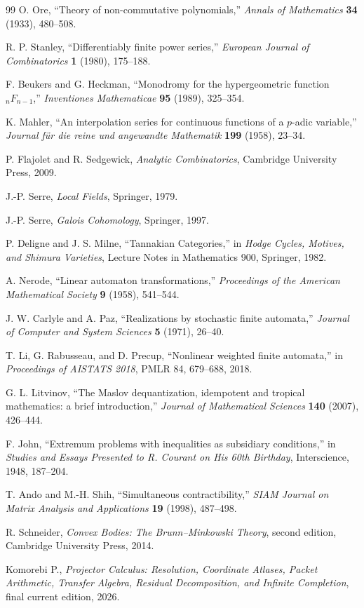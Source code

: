 \documentclass[11pt]{article}
\theoremstyle{definition}
\theoremstyle{remark}
\begin{document}
\begin{thebibliography}{99}
O. Ore, ``Theory of non-commutative polynomials,'' \emph{Annals of Mathematics} \textbf{34} (1933), 480--508.

R. P. Stanley, ``Differentiably finite power series,'' \emph{European Journal of Combinatorics} \textbf{1} (1980), 175--188.

F. Beukers and G. Heckman, ``Monodromy for the hypergeometric function \({}_nF_{n-1}\),'' \emph{Inventiones Mathematicae} \textbf{95} (1989), 325--354.

K. Mahler, ``An interpolation series for continuous functions of a \(p\)-adic variable,'' \emph{Journal f\"ur die reine und angewandte Mathematik} \textbf{199} (1958), 23--34.

P. Flajolet and R. Sedgewick, \emph{Analytic Combinatorics}, Cambridge University Press, 2009.

J.-P. Serre, \emph{Local Fields}, Springer, 1979.

J.-P. Serre, \emph{Galois Cohomology}, Springer, 1997.

P. Deligne and J. S. Milne, ``Tannakian Categories,'' in \emph{Hodge Cycles, Motives, and Shimura Varieties}, Lecture Notes in Mathematics 900, Springer, 1982.


A. Nerode, ``Linear automaton transformations,'' \emph{Proceedings of the American Mathematical Society} \textbf{9} (1958), 541--544.

J. W. Carlyle and A. Paz, ``Realizations by stochastic finite automata,'' \emph{Journal of Computer and System Sciences} \textbf{5} (1971), 26--40.

T. Li, G. Rabusseau, and D. Precup, ``Nonlinear weighted finite automata,'' in \emph{Proceedings of AISTATS 2018}, PMLR 84, 679--688, 2018.

G. L. Litvinov, ``The Maslov dequantization, idempotent and tropical mathematics: a brief introduction,'' \emph{Journal of Mathematical Sciences} \textbf{140} (2007), 426--444.

F. John, ``Extremum problems with inequalities as subsidiary conditions,'' in \emph{Studies and Essays Presented to R. Courant on His 60th Birthday}, Interscience, 1948, 187--204.

T. Ando and M.-H. Shih, ``Simultaneous contractibility,'' \emph{SIAM Journal on Matrix Analysis and Applications} \textbf{19} (1998), 487--498.

R. Schneider, \emph{Convex Bodies: The Brunn--Minkowski Theory}, second edition, Cambridge University Press, 2014.

Komorebi P., \emph{Projector Calculus: Resolution, Coordinate Atlases, Packet Arithmetic, Transfer Algebra, Residual Decomposition, and Infinite Completion}, final current edition, 2026.

\end{thebibliography}
\end{document}
